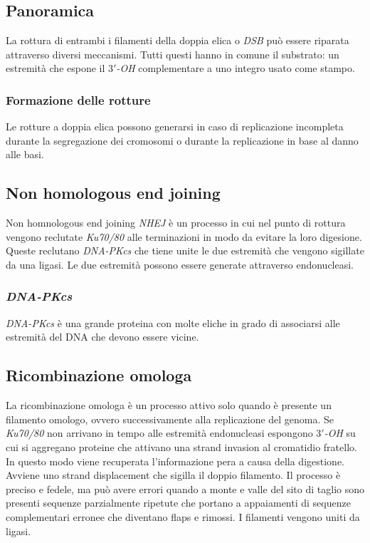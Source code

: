 	\subsection{Panoramica}
	La rottura di entrambi i filamenti della doppia elica o \emph{DSB} pu\`o essere riparata attraverso diversi meccanismi.
	Tutti questi hanno in comune il substrato: un estremit\`a che espone il \emph{$3'$-OH} complementare a uno integro usato come stampo.

		\subsubsection{Formazione delle rotture}
		Le rotture a doppia elica possono generarsi in caso di replicazione incompleta durante la segregazione dei cromosomi o durante la replicazione in base al danno alle basi.

	\subsection{Non homologous end joining}
	Non homnologous end joining \emph{NHEJ} \`e un processo in cui nel punto di rottura vengono reclutate \emph{Ku70/80} alle terminazioni in modo da evitare la loro digesione.
	Queste reclutano \emph{DNA-PKcs} che tiene unite le due estremit\`a che vengono sigillate da una ligasi.
	Le due estremit\`a possono essere generate attraverso endonucleasi.

		\subsubsection{\emph{DNA-PKcs}}
		\emph{DNA-PKcs} \`e una grande proteina con molte eliche in grado di associarsi alle estremit\`a del DNA che devono essere vicine.

	\subsection{Ricombinazione omologa}
	La ricombinazione omologa \`e un processo attivo solo quando \`e presente un filamento omologo, ovvero successivamente alla replicazione del genoma.
	Se \emph{Ku70/80} non arrivano in tempo alle estremit\`a endonucleasi espongono \emph{$3'$-OH} su cui si aggregano proteine che attivano una strand invasion al cromatidio fratello.
	In questo modo viene recuperata l'informazione pera a causa della digestione.
	Avviene uno strand displacement che sigilla il doppio filamento.
	Il processo \`e preciso e fedele, ma pu\`o avere errori quando a monte e valle del sito di taglio sono presenti sequenze parzialmente ripetute che portano a appaiamenti di sequenze complementari erronee che diventano flaps e rimossi.
	I filamenti vengono uniti da ligasi.


